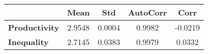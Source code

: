 \begin{tiny}\begin{tabular}{|l|c|c|c|c|}
\hline
&\textbf{Mean}&\textbf{Std}&\textbf{AutoCorr}&\textbf{Corr}\\\hline
\textbf{Productivity}&2.9548&0.0004&0.9982&-0.0219\\\hline
\textbf{Inequality}&2.7145&0.0383&0.9979&0.0332\\\hline
\end{tabular}
\end{tiny}